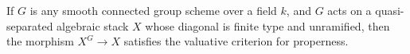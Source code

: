 \begin{proposition}\label{rl-000M}
  If \(G\) is any smooth connected group scheme over a field \(k\), and \(G\) acts on a quasi-separated algebraic stack \(X\) whose diagonal is finite type and unramified, then the morphism \(X^{G}\to X\) satisfies the valuative criterion for properness.
\end{proposition}
